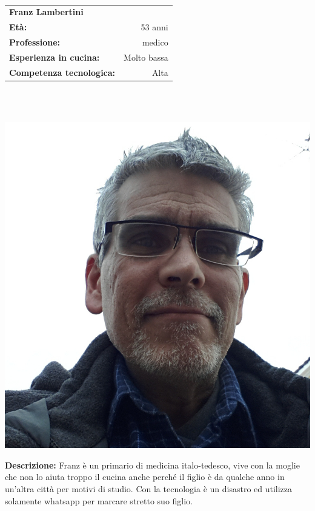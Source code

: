\hrulefill\\
\begin{minipage}{.75\textwidth}
\begin{tabular}{l | r}
\textbf{Franz Lambertini} & \\
\textbf{Età:} & 53 anni\\
\textbf{Professione:} & medico\\
\textbf{Esperienza in cucina:} & Molto bassa\\
\textbf{Competenza tecnologica:} & Alta\\
\end{tabular}\\\\
\end{minipage}
\begin{minipage}{.24\textwidth}
	\includegraphics[width=\textwidth]{img/personas/franz}
\end{minipage}
	\textbf{Descrizione:}
	Franz è un primario di medicina italo-tedesco, vive con la moglie che
	non lo aiuta troppo il cucina anche perché il figlio è da qualche anno
	in un'altra città per motivi di studio. Con la
	tecnologia è un disastro ed utilizza solamente whatsapp per marcare
	stretto suo figlio.

